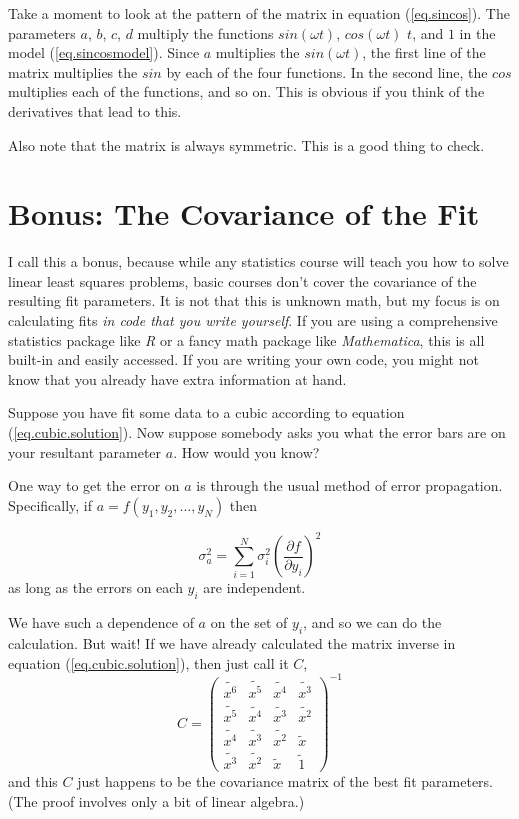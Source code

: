\documentclass[letterpaper,12pt]{article}
\newcommand{\myMatrix}[1]{\bm{\mathit{#1}}}
\begin{document}
Take a moment to look at the pattern of the matrix in equation (\ref{eq.sincos}). The parameters $a$, $b$, $c$, $d$ multiply the functions $sin(\omega t)$, $cos(\omega t)$ $t$, and $1$ in the model (\ref{eq.sincosmodel}). Since $a$ multiplies the $sin(\omega t)$, the first line of the matrix multiplies the $sin$ by each of the four functions. In the second line, the $cos$ multiplies each of the functions, and so on. This is obvious if you think of the derivatives that lead to this.

Also note that the matrix is always symmetric. This is a good thing to check.

\section{Bonus: The Covariance of the Fit}

I call this a bonus, because while any statistics course will teach you how to solve linear least squares problems, basic courses don't cover the covariance of the resulting fit parameters. It is not that this is unknown math, but my focus is on calculating fits \textit{in code that you write yourself}. If you are using a comprehensive statistics package like \textit{R} or a fancy math package like \textit{Mathematica}, this is all built-in and easily accessed. If you are writing your own code, you might not know that you already have extra information at hand.

Suppose you have fit some data to a cubic according to equation (\ref{eq.cubic.solution}).  Now suppose somebody asks you what the error bars are on your resultant parameter $a$.  How would you know?

One way to get the error on $a$ is through the usual method of error propagation. Specifically, if $a=f(y_1,y_2,...,y_N)$ then 

\begin{equation}
\sigma_a^2=\sum_{i=1}^N \sigma_i^2(\frac{\partial f}{\partial y_i})^2
\end{equation}
as long as the errors on each $y_i$ are independent.

We have such a dependence of $a$ on the set of $y_i$, and so we can do the calculation.  But wait!  If we have already calculated the matrix inverse in equation (\ref{eq.cubic.solution}), then just call it $\myMatrix{C}$,
\begin{equation}
\myMatrix{C}=\begin{pmatrix}
\widetilde{x^6} & \widetilde{x^5} & \widetilde{x^4} & \widetilde{x^3} \\
\widetilde{x^5} & \widetilde{x^4} & \widetilde{x^3} & \widetilde{x^2} \\
\widetilde{x^4} & \widetilde{x^3} & \widetilde{x^2} & \widetilde{x} \\
\widetilde{x^3} & \widetilde{x^2} & \widetilde{x} & \widetilde{1} 
\end{pmatrix} ^{-1}
\end{equation}
and this $\myMatrix{C}$ just happens to be the covariance matrix of the best fit parameters. (The proof involves only a bit of linear algebra.)
\end{document}
